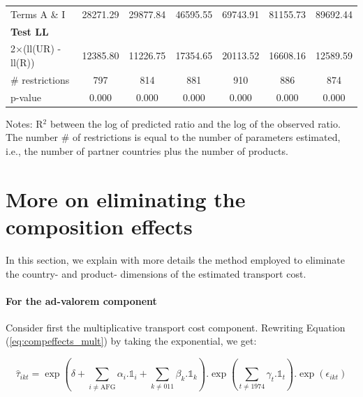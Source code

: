 \documentclass[a4paper,11pt]{article}
\begin{document}
\begin{table}[htbp]
\begin{center}
{\begin{tabular}{l|cccccc}
Terms A \& I & 28271.29 & 29877.84 & \multicolumn{1}{c}{46595.55} & \multicolumn{1}{c}{69743.91} & \multicolumn{1}{c}{81155.73} & \multicolumn{1}{c}{89692.44} \\
\textbf{Test LL} &       &       & & &  & \\
2$\times$(ll(UR) -ll(R)) & 12385.80 & 11226.75 & \multicolumn{1}{c}{17354.65} & \multicolumn{1}{c}{20113.52} & \multicolumn{1}{c}{16608.16} & \multicolumn{1}{c}{12589.59} \\
\# restrictions  & 797   & 814   & \multicolumn{1}{c}{881} & \multicolumn{1}{c}{910} & \multicolumn{1}{c}{886} & \multicolumn{1}{c}{874} \\
p-value & 0.000 & 0.000 & \multicolumn{1}{c}{0.000} & \multicolumn{1}{c}{0.000} & \multicolumn{1}{c}{0.000} & \multicolumn{1}{c}{0.000} \\
\hline\hline
\end{tabular}}
\end{center}
  \vspace{-10pt}\tiny{Notes: R$^{2}$ between the log of predicted ratio and the log of the observed ratio. The number \# of restrictions is equal to the number of parameters estimated, i.e., the number of partner countries plus the number of products.}
\end{table}%

\section{More on eliminating the composition effects \label{app:comp-effects}}

In this section, we explain with more details the method employed to eliminate the country- and product- dimensions of the estimated transport cost. 

\paragraph{For the ad-valorem component} Consider first the multiplicative transport cost component. Rewriting Equation (\ref{eq:compeffects_mult}) by taking the exponential, we get:

\begin{equation*}
\widehat{\tau}_{ikt}=\exp\left(\delta + \sum_{i \neq \text{AFG}}\alpha_i.\mathbb{1}_i+\sum_{k\neq \text{011}}\beta_k.\mathbb{1}_k\right).\exp\left(\sum_{t \neq 1974}\gamma_t.\mathbb{1}_t\right) .\exp\left(\epsilon_{ikt}\right)
\end{equation*}
\end{document}
